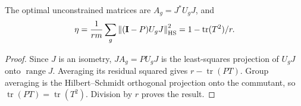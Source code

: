 \begin{spectrallemma}
\label{sp:regression}
The optimal unconstrained matrices are $A_g=J^*U_gJ$, and
\begin{equation}
 \eta=\frac1{rm}\sum_g\left\lVert (\mathbf{I}-P)U_gJ\right\rVert_{\mathrm{HS}}^2
 =1-\operatorname{tr}(T^2)/r.
 \label{sp:eta}
\end{equation}
\end{spectrallemma}
\begin{proof}
Since $J$ is an isometry, $JA_g=PU_gJ$ is the least-squares projection of $U_gJ$ onto $\operatorname{range}J$. Averaging its residual squared gives $r-\operatorname{tr}(PT)$. Group averaging is the Hilbert--Schmidt orthogonal projection onto the commutant, so $\operatorname{tr}(PT)=\operatorname{tr}(T^2)$. Division by $r$ proves the result.
\end{proof}

